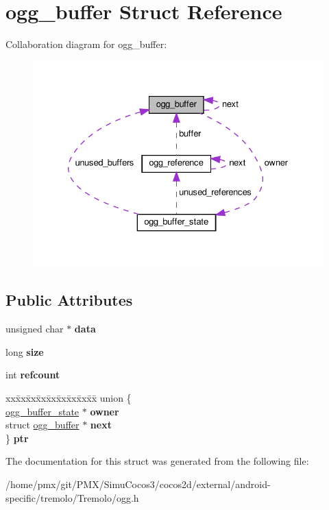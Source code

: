 \hypertarget{structogg__buffer}{}\section{ogg\+\_\+buffer Struct Reference}
\label{structogg__buffer}


Collaboration diagram for ogg\+\_\+buffer\+:
\nopagebreak
\begin{figure}[H]
\begin{center}
\leavevmode
\includegraphics[width=330pt]{structogg__buffer__coll__graph}
\end{center}
\end{figure}
\subsection*{Public Attributes}
\begin{DoxyCompactItemize}
\item 
\mbox{\label{structogg__buffer_a8d673107bc2db15f446441454529a4e8}} 
unsigned char $\ast$ {\bfseries data}
\item 
\mbox{\label{structogg__buffer_a991662dcb82f65e0a02a22d53c34055e}} 
long {\bfseries size}
\item 
\mbox{\label{structogg__buffer_a8a9cecada4506f8d0b30ede9d5168afb}} 
int {\bfseries refcount}
\item 
\mbox{\label{structogg__buffer_af2a9c42668709e36b14de9ad4997be1e}} 
\begin{tabbing}
xx\=xx\=xx\=xx\=xx\=xx\=xx\=xx\=xx\=\kill
union \{\\
\>\hyperlink{structogg__buffer__state}{ogg\_buffer\_state} $\ast$ {\bfseries owner}\\
\>struct \hyperlink{structogg__buffer}{ogg\_buffer} $\ast$ {\bfseries next}\\
\} {\bfseries ptr}\\

\end{tabbing}\end{DoxyCompactItemize}


The documentation for this struct was generated from the following file\+:\begin{DoxyCompactItemize}
\item 
/home/pmx/git/\+P\+M\+X/\+Simu\+Cocos3/cocos2d/external/android-\/specific/tremolo/\+Tremolo/ogg.\+h\end{DoxyCompactItemize}

